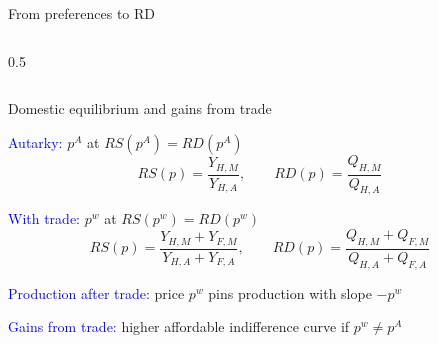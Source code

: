 \documentclass[notes,11pt, aspectratio=169, xcolor=table]{beamer}
\newcommand{\blue}[1]{\textcolor{blue}{#1}}
\newenvironment{wideitemize}{\itemize\addtolength{\itemsep}{10pt}}{\enditemize}
\begin{document}
\begin{frame}{From preferences to RD}
\begin{columns}[T]
\begin{column}{0.5\textwidth}
\end{column}
\end{columns}
\end{frame}

\begin{frame}{Domestic equilibrium and gains from trade}
\begin{wideitemize}
  \item \blue{Autarky:} $p^A$ at $RS(p^A)=RD(p^A)$
  \begin{equation*}
      RS(p) = \frac{Y_{H,M}}{Y_{H,A}}, \qquad RD(p) = \frac{Q_{H,M}}{Q_{H,A}}
  \end{equation*}
  \item<2-> \blue{With trade:} $p^w$ at $RS(p^w)=RD(p^w)$
  \begin{equation*}
      RS(p) = \frac{Y_{H,M}+ Y_{F,M}}{Y_{H,A} + Y_{F,A}}, \qquad RD(p) = \frac{Q_{H,M} + Q_{F,M}}{Q_{H,A} + Q_{F,A}}
  \end{equation*}
  \item<3-> \blue{Production after trade:} price $p^w$ pins production with slope $-p^w$
  \item<4-> \blue{Gains from trade:} higher affordable indifference curve if $p^w \neq p^A$
\end{wideitemize}
\end{frame}
\end{document}
